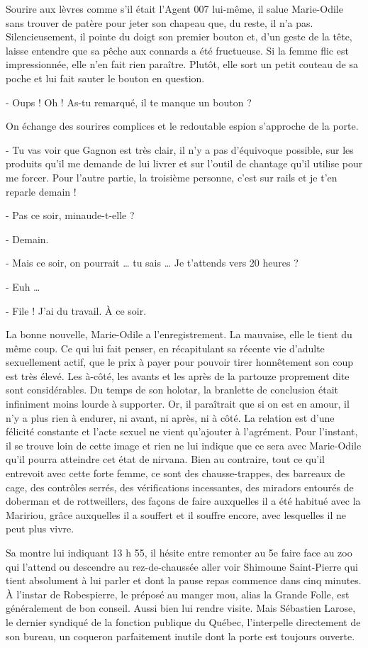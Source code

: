 Sourire aux lèvres comme s’il était l’Agent 007 lui-même, il salue Marie-Odile sans trouver de patère pour jeter son chapeau que, du reste, il n’a pas. Silencieusement, il pointe du doigt son premier bouton et, d’un geste de la tête, laisse entendre que sa pêche aux connards a été fructueuse. Si la femme flic est impressionnée, elle n’en fait rien paraître. Plutôt, elle sort un petit couteau de sa poche et lui fait sauter le bouton en question.

- Oups ! Oh ! As-tu remarqué, il te manque un bouton ?

On échange des sourires complices et le redoutable espion s’approche de la porte.

- Tu vas voir que Gagnon est très clair, il n’y a pas d’équivoque possible, sur les produits qu’il me demande de lui livrer et sur l’outil de chantage qu’il utilise pour me forcer. Pour l’autre partie, la troisième personne, c’est sur rails et je t’en reparle demain !

- Pas ce soir, minaude-t-elle ?

- Demain.

- Mais ce soir, on pourrait … tu sais … Je t’attends vers 20 heures ?

- Euh …

- File ! J’ai du travail. À ce soir.

La bonne nouvelle, Marie-Odile a l’enregistrement. La mauvaise, elle le tient du même coup. Ce qui lui fait penser, en récapitulant sa récente vie d’adulte sexuellement actif, que le prix à payer pour pouvoir tirer honnêtement son coup est très élevé. Les à-côté, les avants et les après de la partouze proprement dite sont considérables. Du temps de son holotar, la branlette de conclusion était infiniment moins lourde à supporter. Or, il paraîtrait que si on est en amour, il n’y a plus rien à endurer, ni avant, ni après, ni à côté. La relation est d’une félicité constante et l’acte sexuel ne vient qu’ajouter à l’agrément. Pour l’instant, il se trouve loin de cette image et rien ne lui indique que ce sera avec Marie-Odile qu’il pourra atteindre cet état de nirvana. Bien au contraire, tout ce qu’il entrevoit avec cette forte femme, ce sont des chausse-trappes, des barreaux de cage, des contrôles serrés, des vérifications incessantes, des miradors entourés de doberman et de rottweillers, des façons de faire auxquelles il a été habitué avec la Maririou, grâce auxquelles il a souffert et il souffre encore, avec lesquelles il ne peut plus vivre.

Sa montre lui indiquant 13 h 55, il hésite entre remonter au 5e faire face au zoo qui l’attend ou descendre au rez-de-chaussée aller voir Shimoune Saint-Pierre qui tient absolument à lui parler et dont la pause repas commence dans cinq minutes. À l’instar de Robespierre, le préposé au manger mou, alias la Grande Folle, est généralement de bon conseil. Aussi bien lui rendre visite. Mais Sébastien Larose, le dernier syndiqué de la fonction publique du Québec, l’interpelle directement de son bureau, un coqueron parfaitement inutile dont la porte est toujours ouverte.

